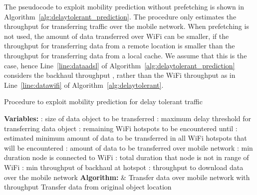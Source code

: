 \documentclass{sig-alternate}
\newcommand{\mynotex}[1]{}
\begin{document}
The pseudocode to exploit mobility prediction without prefetching is shown in Algorithm~\ref{alg:delaytolerant_prediction}.
The procedure only estimates the throughput for transferring traffic over the mobile network. When prefetching is not used, the amount of data transferred over WiFi can be smaller, if  the throughput for transferring data from a remote location is smaller than the throughput for transferring data from a local cache. We assume that this is the case, hence Line~\ref{line:dataadsl} of Algorithm~\ref{alg:delaytolerant_prediction} considers the backhaul throughput , rather than the WiFi throughput as in Line~\ref{line:datawifi} of Algorithm~\ref{alg:delaytolerant}.


\begin{algorithm}
\caption{Procedure to exploit mobility prediction  for delay tolerant traffic}
\begin{algorithmic}[1]
\label{alg:delaytolerant_prediction}
{\scriptsize
\STATE \textbf{Variables:}
\STATE : size of data object to be transferred
\STATE : maximum delay threshold for transferring data object
\STATE : remaining  WiFi hotspots to be encountered until  
\STATE : estimated minimum amount of data to be transferred in all WiFi hotspots that will be encountered
\STATE : amount of data  to be transferred over mobile network
\STATE : min duration node is connected  to WiFi  
\STATE : total duration that node is not in range of WiFi
\STATE : min throughput of backhaul  at hotspot  
\STATE : throughput to download data over the mobile network
\STATE \textbf{Algorithm:}
\STATE   \label{line:dataadsl}
\STATE 
\STATE   \& 
\STATE 
\STATE Transfer data over mobile network with throughput 
\STATE Transfer data from original object location
\ENDIF
\label{line:1endb}
\\ }
\end{algorithmic}
\end{algorithm}


\mynotex{
\begin{itemize}
\item Key idea is to minimize usage mobile network while assuring that the delay constraint will be satisfied.
\item Must estimate minimum amount of data to be transferred using WiFi. Calculated mobile throughput from remaining data that needs to be transferred.
\item When switch to mobile network do two things: 1) estimate mobile throughput, 2) estimate data to cache in next wifi hotspot.
\item we assume node is connected to mobile network at all times
\item when we do not perform prefetching, the transfer throughput when node is in WiFi hotspot is lower than the throughput of WiFi due e.g. to ADSL link or because throughput for transferring from remote location is smaller
\item In case prefetching is not used, the procedure just decides the throughput to use while connected to the mobile network.
\end{itemize}

}
\end{document}
